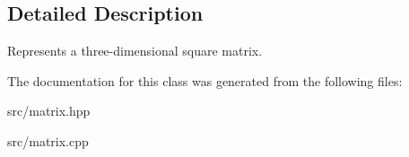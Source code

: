 \subsection{Detailed Description}
Represents a three-\/dimensional square matrix. 

The documentation for this class was generated from the following files\+:\begin{DoxyCompactItemize}
\item 
src/matrix.\+hpp\item 
src/matrix.\+cpp\end{DoxyCompactItemize}
